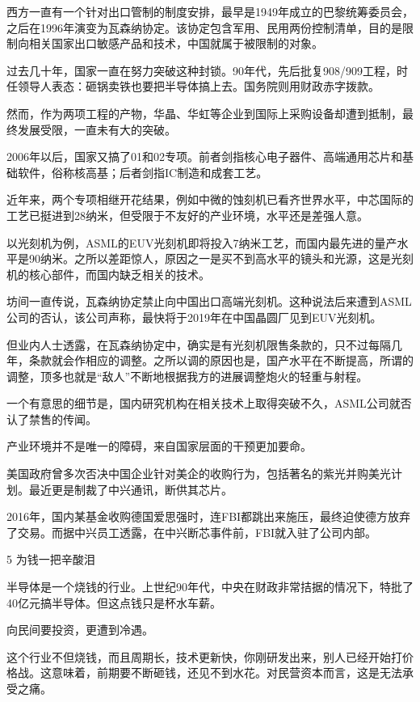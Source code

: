 \documentclass[utf8]{book}
\begin{document}
	西方一直有一个针对出口管制的制度安排，最早是1949年成立的巴黎统筹委员会，之后在1996年演变为瓦森纳协定。该协定包含军用、民用两份控制清单，目的是限制向相关国家出口敏感产品和技术，中国就属于被限制的对象。

	过去几十年，国家一直在努力突破这种封锁。90年代，先后批复908/909工程，时任领导人表态：砸锅卖铁也要把半导体搞上去。国务院则用财政赤字拨款。

	然而，作为两项工程的产物，华晶、华虹等企业到国际上采购设备却遭到抵制，最终发展受限，一直未有大的突破。

	2006年以后，国家又搞了01和02专项。前者剑指核心电子器件、高端通用芯片和基础软件，俗称核高基；后者剑指IC制造和成套工艺。

	近年来，两个专项相继开花结果，例如中微的蚀刻机已看齐世界水平，中芯国际的工艺已挺进到28纳米，但受限于不友好的产业环境，水平还是差强人意。

	以光刻机为例，ASML的EUV光刻机即将投入7纳米工艺，而国内最先进的量产水平是90纳米。之所以差距惊人，原因之一是买不到高水平的镜头和光源，这是光刻机的核心部件，而国内缺乏相关的技术。

	坊间一直传说，瓦森纳协定禁止向中国出口高端光刻机。这种说法后来遭到ASML公司的否认，该公司声称，最快将于2019年在中国晶圆厂见到EUV光刻机。

	但业内人士透露，在瓦森纳协定中，确实是有光刻机限售条款的，只不过每隔几年，条款就会作相应的调整。之所以调的原因也是，国产水平在不断提高，所谓的调整，顶多也就是“敌人”不断地根据我方的进展调整炮火的轻重与射程。

	一个有意思的细节是，国内研究机构在相关技术上取得突破不久，ASML公司就否认了禁售的传闻。

	产业环境并不是唯一的障碍，来自国家层面的干预更加要命。

	美国政府曾多次否决中国企业针对美企的收购行为，包括著名的紫光并购美光计划。最近更是制裁了中兴通讯，断供其芯片。

	2016年，国内某基金收购德国爱思强时，连FBI都跳出来施压，最终迫使德方放弃了交易。而据中兴员工透露，在中兴断芯事件前，FBI就入驻了公司内部。



	\begin{flushleft}
		{\Large 5 为钱一把辛酸泪}
	\end{flushleft}

	半导体是一个烧钱的行业。上世纪90年代，中央在财政非常拮据的情况下，特批了40亿元搞半导体。但这点钱只是杯水车薪。

	向民间要投资，更遭到冷遇。

	这个行业不但烧钱，而且周期长，技术更新快，你刚研发出来，别人已经开始打价格战。这意味着，前期要不断砸钱，还见不到水花。对民营资本而言，这是无法承受之痛。
\end{document}
